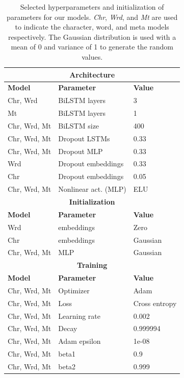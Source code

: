 \documentclass[11pt,a4paper]{article}
\begin{document}
\begin{table}[t!]
\begin{center}
\small
\begin{tabular}{|l|l|l|}
\hline 
\multicolumn{3}{|c|}{\bf Architecture } \\ \hline
\bf Model          &\bf Parameter        & \bf Value \\ \hline
Chr, Wrd           & BiLSTM layers      & 3 \\
Mt                 & BiLSTM layers      & 1 \\
Chr, Wrd, Mt       & BiLSTM size        & 400 \\
Chr, Wrd, Mt       & Dropout LSTMs      & 0.33 \\
Chr, Wrd, Mt       & Dropout MLP        & 0.33 \\
Wrd                & Dropout embeddings & 0.33 \\ 
Chr                & Dropout embeddings & 0.05 \\ 
Chr, Wrd, Mt       & Nonlinear act. (MLP) & ELU \\ \hline
\hline 
\multicolumn{3}{|c|}{\bf Initialization } \\ \hline
\bf Model          &\bf Parameter &\bf Value \\ 
Wrd                & embeddings        & Zero \\
Chr                & embeddings        & Gaussian \\
Chr, Wrd, Mt       & MLP               & Gaussian\\ \hline
\hline 
\multicolumn{3}{|c|}{\bf Training } \\ \hline
\bf Model          &\bf Parameter        & \bf Value \\ \hline
Chr, Wrd, Mt       & Optimizer          & Adam\\
Chr, Wrd, Mt       & Loss               & Cross entropy\\
Chr, Wrd, Mt       & Learning rate      & 0.002\\
Chr, Wrd, Mt       & Decay              & 0.999994\\
Chr, Wrd, Mt       & Adam epsilon       & 1e-08\\
Chr, Wrd, Mt       & beta1              & 0.9\\
Chr, Wrd, Mt       & beta2              & 0.999\\\hline
\end{tabular}
\end{center}
\caption{\label{table:hyper-params} Selected hyperparameters and initialization of parameters for our models. \emph{Chr}, \emph{Wrd}, and \emph{Mt} are used to indicate the character, word, and meta models respectively.
The Gaussian distribution is used with a mean of 0 and variance of 1 to generate the random values. 
}
\end{table}
\end{document}
